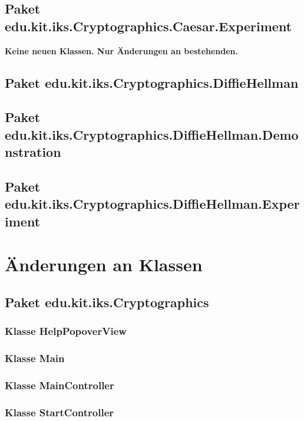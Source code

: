 \documentclass{article}
\begin{document}
  \subsection{Paket edu.kit.iks.Cryptographics.Caesar.Experiment}
   \textbf{Keine neuen Klassen. Nur Änderungen an bestehenden.}
  \subsection{Paket edu.kit.iks.Cryptographics.DiffieHellman}
  
  \subsection{Paket edu.kit.iks.Cryptographics.DiffieHellman.Demonstration}

  \subsection{Paket edu.kit.iks.Cryptographics.DiffieHellman.Experiment}

\section{Änderungen an Klassen}

  \subsection{Paket edu.kit.iks.Cryptographics}
    \subsubsection{Klasse HelpPopoverView}

    \subsubsection{Klasse Main}

    \subsubsection{Klasse MainController}

    \subsubsection{Klasse StartController}
\end{document}
